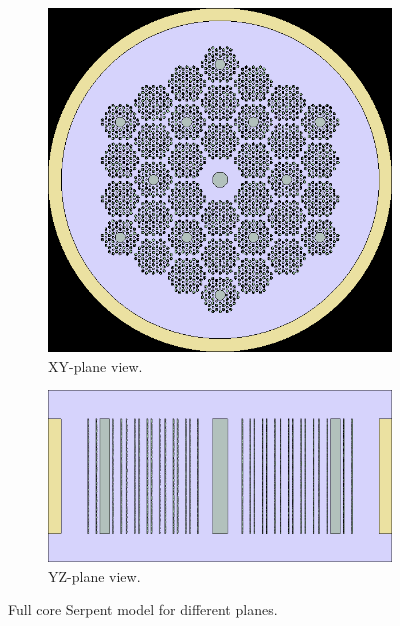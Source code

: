 \documentclass[11pt,letterpaper]{article}
\begin{document}
	\begin{figure}[htbp!]
		\centering
		\begin{subfigure}[t]{0.4\textwidth}
			\centering
			\includegraphics[width=\linewidth]{figures/fullcore_geom1.png} 
			\caption{XY-plane view.}
		\end{subfigure}
		\begin{subfigure}[t]{0.4\textwidth}
			\centering
			\includegraphics[width=\linewidth]{figures/fullcore_geom2.png}
			\caption{YZ-plane view.}
		\end{subfigure}
		\hfill
		\caption{Full core Serpent model for different planes.}
		\label{fig:full}
	\end{figure}
\end{document}
